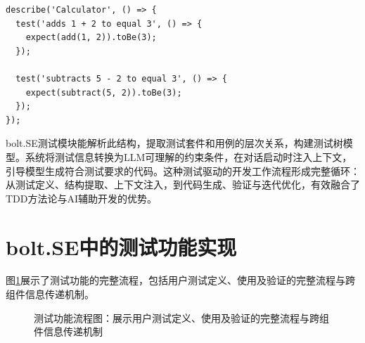 \begin{verbatim}
describe('Calculator', () => {
  test('adds 1 + 2 to equal 3', () => {
    expect(add(1, 2)).toBe(3);
  });
  
  test('subtracts 5 - 2 to equal 3', () => {
    expect(subtract(5, 2)).toBe(3);
  });
});
\end{verbatim}

bolt.SE测试模块能解析此结构，提取测试套件和用例的层次关系，构建测试树模型。系统将测试信息转换为LLM可理解的约束条件，在对话启动时注入上下文，引导模型生成符合测试要求的代码。这种测试驱动的开发工作流程形成完整循环：从测试定义、结构提取、上下文注入，到代码生成、验证与迭代优化，有效融合了TDD方法论与AI辅助开发的优势。

\section{bolt.SE中的测试功能实现}

图\ref{fig:test_sequence}展示了测试功能的完整流程，包括用户测试定义、使用及验证的完整流程与跨组件信息传递机制。

\begin{figure}
  \centering
  \caption{测试功能流程图：展示用户测试定义、使用及验证的完整流程与跨组件信息传递机制}
  \label{fig:test_sequence}
\end{figure}

